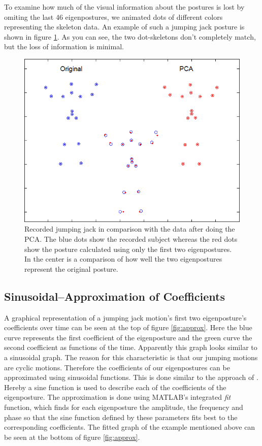 \documentclass[a4paper]{article}
\begin{document}
To examine how much of the visual information about the postures is lost by omiting the last 46 eigenpostures, we animated dots of different colors representing the skeleton data.
An example of such a jumping jack posture is shown in figure \ref{fig:orig_pca_1}.
As you can see, the two dot-skeletons don't completely match, but the loss of information is minimal.

\begin{figure}
		\centering
		\includegraphics[height=0.3\textheight]{comparison_Original_PCA.png}
		\caption{Recorded jumping jack in comparison with the data after doing the PCA.
		The blue dots show the recorded subject whereas the red dots show the posture calculated using only the first two eigenpostures.
		In the center is a comparison of how well the two eigenpostures represent the original posture.
		}
		\label{fig:orig_pca_1}
\end{figure}


\subsection{Sinusoidal--Approximation of Coefficients}\label{sinusoidalApprox}
A graphical representation of a jumping jack motion's first two eigenposture's coefficients over time can be seen at the top of figure \ref{fig:approx}.
Here the blue curve represents the first coefficient of the eigenposture and the green curve the second coefficient as functions of the time.
Apparently this graph looks similar to a sinusoidal graph.
The reason for this characteristic is that our jumping motions are cyclic motions.
Therefore the coefficients of our eigenpostures can be approximated using sinusoidal functions.
This is done similar to the approach of \cite{origin}.
Hereby a sine function is used to describe each of the coefficients of the eigenposture.
The approximation is done using MATLAB's integrated \emph{fit} function, which finds for each eigenposture the amplitude, the frequency and phase so that the sine function defined by these parameters fits best to the corresponding coefficients.
The fitted graph of the example mentioned above can be seen at the bottom of figure \ref{fig:approx}.
\end{document}

